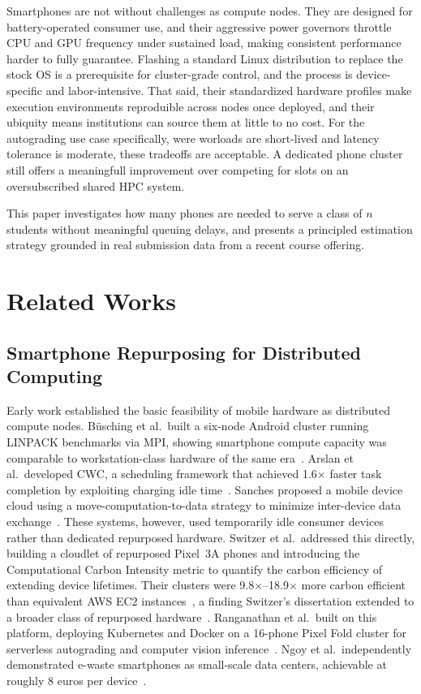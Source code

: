 \documentclass[acmlarge]{acmart}
\begin{document}
Smartphones are not without challenges as compute nodes. They are designed for battery-operated consumer use, and their aggressive power governors throttle CPU and GPU frequency under sustained load, making consistent performance harder to fully guarantee. Flashing a standard Linux distribution to replace the stock OS is a prerequisite for cluster-grade control, and the process is device-specific and labor-intensive. That said, their standardized hardware profiles make execution environments reproduible across nodes once deployed, and their ubiquity means institutions can source them at little to no cost. For the autograding use case specifically, were worloads are short-lived and latency tolerance is moderate, these tradeoffs are acceptable. A dedicated phone cluster still offers a meaningfull improvement over competing for slots on an oversubscribed shared HPC system.

This paper investigates how many phones are needed to serve a class of $n$ students without meaningful queuing delays, and presents a principled estimation strategy grounded in real submission data from a recent course offering.

\section{Related Works}
 
\subsection{Smartphone Repurposing for Distributed Computing}

Early work established the basic feasibility of mobile hardware as distributed compute nodes. Büsching et al.\ built a six-node Android cluster running LINPACK benchmarks via MPI, showing smartphone compute capacity was comparable to workstation-class hardware of the same era~\cite{busching2012droidcluster}. Arslan et al.\ developed CWC, a scheduling framework that achieved 1.6$\times$ faster task completion by exploiting charging idle time~\cite{arslan2015cwc}. Sanches proposed a mobile device cloud using a move-computation-to-data strategy to minimize inter-device data exchange~\cite{sanches2017distributed}. These systems, however, used temporarily idle consumer devices rather than dedicated repurposed hardware. Switzer et al.\ addressed this directly, building a cloudlet of repurposed Pixel~3A phones and introducing the Computational Carbon Intensity metric to quantify the carbon efficiency of extending device lifetimes. Their clusters were 9.8$\times$--18.9$\times$ more carbon efficient than equivalent AWS EC2 instances~\cite{10.1145/3575693.3575710}, a finding Switzer's dissertation extended to a broader class of repurposed hardware~\cite{switzer2025hardware}. Ranganathan et al.\ built on this platform, deploying Kubernetes and Docker on a 16-phone Pixel Fold cluster for serverless autograding and computer vision inference~\cite{ranganathan2025junkyard}. Ngoy et al.\ independently demonstrated e-waste smartphones as small-scale data centers, achievable at roughly 8 euros per device~\cite{ngoy2025ewaste}.
 
\end{document}
